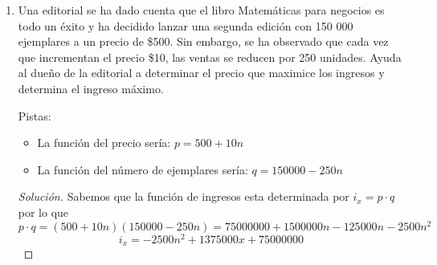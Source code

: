 \documentclass[12pt]{article}
\newenvironment{solution}{\begin{proof}[Solución]}{\end{proof}}
\begin{document}
\begin{enumerate}
    La función de ingresos en función del precio se expresa de la siguiente forma:
    \[i_{(p)} = 1500p-2p^2\]
    \begin{solution}
        Para maximizar los ingresos usamos la formula y obtenemos \[x = \frac{-b}{2a} = \frac{-1500}{-4} = 375\] por lo que el precio sugerido sería de\$375
    \end{solution}

    \item Una editorial se ha dado cuenta que el libro Matemáticas para negocios es todo un
    éxito y ha decidido lanzar una segunda edición con 150 000 ejemplares a un
    precio de \$500. Sin embargo, se ha observado que cada vez que incrementan el
    precio \$10, las ventas se reducen por 250 unidades. Ayuda al dueño de la editorial
    a determinar el precio que maximice los ingresos y determina el ingreso máximo.

    Pistas: \begin{itemize}
        \item La función del precio sería: $p = 500+10n$
        \item La función del número de ejemplares sería: $q = 150000-250n$
    \end{itemize} \begin{solution}
        Sabemos que la función de ingresos esta determinada por $i_x = p \cdot q$ por lo que
        \[p \cdot q = (500+10n)(150000-250n) = 75 000 000 + 1500000n - 125 000n - 2500 n^2\] 
        \[i_x = -2500n^2+1375000x +75000000\]
    \end{solution}
\end{enumerate}


\end{document}
